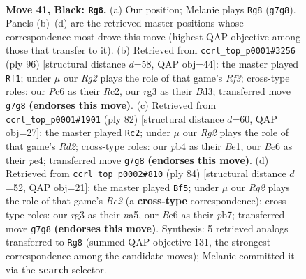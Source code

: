 \documentclass[11pt]{article}
\begin{document}
\clearpage

\begin{figure}[p]\centering
\begin{subfigure}{0.46\textwidth}\centering
\resizebox{\linewidth}{!}{%
\newchessgame
\chessboard[
  setfen={2r1k3/p1p3r1/P1p1b1p1/2P2p1p/1P3P1P/6R1/8/RN2K3 b Q - 5 41},
  showmover=false,
  pgfstyle=straightmove, color=movearrow, markmove={g7-g8}
]}
\caption{}
\end{subfigure}\hfill
\begin{subfigure}{0.46\textwidth}\centering
\resizebox{\linewidth}{!}{%
\newchessgame
\chessboard[
  setfen={3k1r2/8/1p1nr1p1/p2p2Pp/P4P1P/KP1B1R2/2R5/8 w - - 2 49},
  showmover=false,
  pgfstyle=straightmove, color=movearrow, markmove={f3-f1}
]}
\caption{}
\end{subfigure}
\\[4pt]
\begin{subfigure}{0.46\textwidth}\centering
\resizebox{\linewidth}{!}{%
\newchessgame
\chessboard[
  setfen={3r4/4n1p1/p4p1k/2P4P/1p1Pp2P/1P6/1P1R4/4BK2 w - - 2 42},
  showmover=false,
  pgfstyle=straightmove, color=movearrow, markmove={d2-c2}
]}
\caption{}
\end{subfigure}\hfill
\begin{subfigure}{0.46\textwidth}\centering
\resizebox{\linewidth}{!}{%
\newchessgame
\chessboard[
  setfen={1k3r2/1p4p1/7p/n2pP2P/Pp1P2P1/1P6/2B5/K2R4 w - - 1 43},
  showmover=false,
  pgfstyle=straightmove, color=movearrow, markmove={c2-f5}
]}
\caption{}
\end{subfigure}
\caption{\textbf{Move 41, Black: \texttt{Rg8}.} (a) Our position; Melanie plays \texttt{Rg8} (\texttt{g7g8}). Panels (b)--(d) are the retrieved master positions whose correspondence most drove this move (highest QAP objective among those that transfer to it). (b) Retrieved from \texttt{ccrl\_top\_p0001\#3256} (ply 96) [structural distance $d$=58, QAP obj=44]: the master played \texttt{Rf1}; under $\mu$ our \emph{Rg2} plays the role of that game's \emph{Rf3}; cross-type roles: our \emph{P}c6 as their \emph{R}c2, our \emph{r}g3 as their \emph{B}d3; transferred move \texttt{g7g8} \textbf{(endorses this move)}. (c) Retrieved from \texttt{ccrl\_top\_p0001\#1901} (ply 82) [structural distance $d$=60, QAP obj=27]: the master played \texttt{Rc2}; under $\mu$ our \emph{Rg2} plays the role of that game's \emph{Rd2}; cross-type roles: our \emph{p}b4 as their \emph{B}e1, our \emph{B}e6 as their \emph{p}e4; transferred move \texttt{g7g8} \textbf{(endorses this move)}. (d) Retrieved from \texttt{ccrl\_top\_p0002\#810} (ply 84) [structural distance $d$=52, QAP obj=21]: the master played \texttt{Bf5}; under $\mu$ our \emph{Rg2} plays the role of that game's \emph{Bc2} (a \textbf{cross-type} correspondence); cross-type roles: our \emph{r}g3 as their \emph{n}a5, our \emph{B}e6 as their \emph{p}b7; transferred move \texttt{g7g8} \textbf{(endorses this move)}. Synthesis: 5 retrieved analogs transferred to \texttt{Rg8} (summed QAP objective 131, the strongest correspondence among the candidate moves); Melanie committed it via the \texttt{search} selector.}
\label{fig:thought-m81}
\end{figure}
\end{document}
